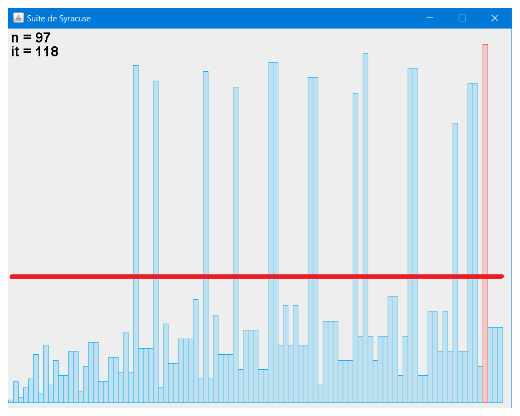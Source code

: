 \documentclass{beamer}
\begin{document}
\begin{frame}
\begin{center}
\includegraphics[scale=0.5]{images/syracuse_pics.PNG}
\end{center}
\end{frame}
\end{document}
